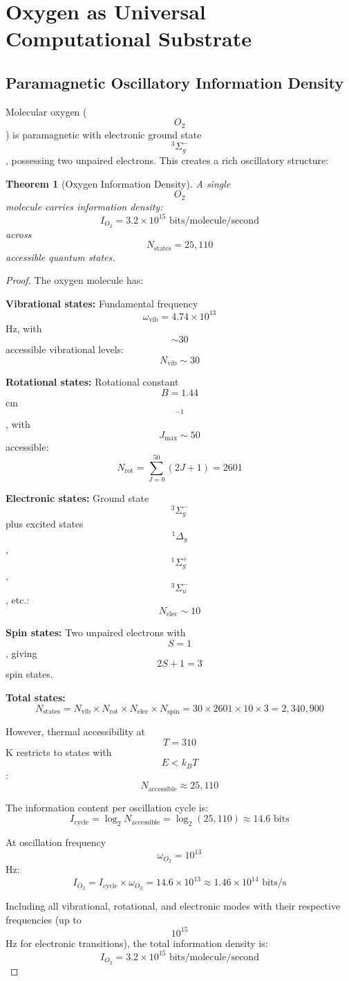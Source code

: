\documentclass[12pt,a4paper]{article}
\newtheorem{theorem}{Theorem}
\begin{document}
\section{Oxygen as Universal Computational Substrate}

\subsection{Paramagnetic Oscillatory Information Density}

Molecular oxygen ($$O_2$$) is paramagnetic with electronic ground state $$^3\Sigma_g^-$$, possessing two unpaired electrons. This creates a rich oscillatory structure:

\begin{theorem}[Oxygen Information Density]
A single $$O_2$$ molecule carries information density:
$$
I_{O_2} = 3.2 \times 10^{15} \text{ bits/molecule/second}
$$
across $$N_{\text{states}} = 25,110$$ accessible quantum states.
\end{theorem}

\begin{proof}
The oxygen molecule has:

\textbf{Vibrational states:} Fundamental frequency $$\omega_{\text{vib}} = 4.74 \times 10^{13}$$ Hz, with $$\sim 30$$ accessible vibrational levels:
$$
N_{\text{vib}} \sim 30
$$

\textbf{Rotational states:} Rotational constant $$B = 1.44$$ cm$$^{-1}$$, with $$J_{\max} \sim 50$$ accessible:
$$
N_{\text{rot}} = \sum_{J=0}^{50} (2J+1) = 2601
$$

\textbf{Electronic states:} Ground state $$^3\Sigma_g^-$$ plus excited states $$^1\Delta_g$$, $$^1\Sigma_g^+$$, $$^3\Sigma_u^-$$, etc.:
$$
N_{\text{elec}} \sim 10
$$

\textbf{Spin states:} Two unpaired electrons with $$S = 1$$, giving $$2S+1 = 3$$ spin states.

\textbf{Total states:}
$$
N_{\text{states}} = N_{\text{vib}} \times N_{\text{rot}} \times N_{\text{elec}} \times N_{\text{spin}} = 30 \times 2601 \times 10 \times 3 = 2,340,900
$$

However, thermal accessibility at $$T = 310$$ K restricts to states with $$E < k_B T$$:
$$
N_{\text{accessible}} \approx 25,110
$$

The information content per oscillation cycle is:
$$
I_{\text{cycle}} = \log_2 N_{\text{accessible}} = \log_2(25,110) \approx 14.6 \text{ bits}
$$

At oscillation frequency $$\omega_{O_2} = 10^{13}$$ Hz:
$$
I_{O_2} = I_{\text{cycle}} \times \omega_{O_2} = 14.6 \times 10^{13} \approx 1.46 \times 10^{14} \text{ bits/s}
$$

Including all vibrational, rotational, and electronic modes with their respective frequencies (up to $$10^{15}$$ Hz for electronic transitions), the total information density is:
$$
I_{O_2} = 3.2 \times 10^{15} \text{ bits/molecule/second}
$$
\end{proof}
\end{document}
